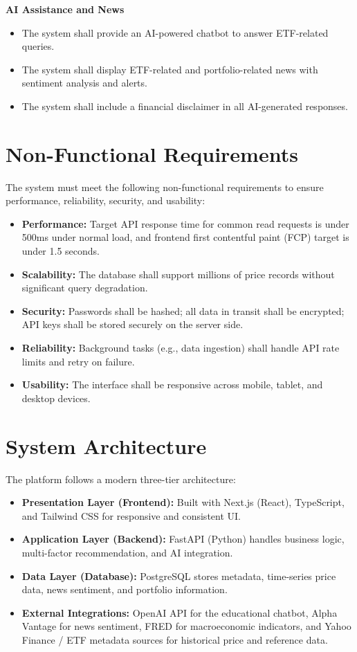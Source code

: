 \textbf{AI Assistance and News}
\begin{itemize}
    \item The system shall provide an AI-powered chatbot to answer ETF-related queries.
    \item The system shall display ETF-related and portfolio-related news with sentiment analysis and alerts.
    \item The system shall include a financial disclaimer in all AI-generated responses.
\end{itemize}




\section{Non-Functional Requirements}

The system must meet the following non-functional requirements to ensure performance, reliability, security, and usability:

\begin{itemize}
    \item \textbf{Performance:} Target API response time for common read requests is under 500ms under normal load, and frontend first contentful paint (FCP) target is under 1.5 seconds. 
    \item \textbf{Scalability:} The database shall support millions of price records without significant query degradation.
    \item \textbf{Security:} Passwords shall be hashed; all data in transit shall be encrypted; API keys shall be stored securely on the server side.
    \item \textbf{Reliability:} Background tasks (e.g., data ingestion) shall handle API rate limits and retry on failure.
    \item \textbf{Usability:} The interface shall be responsive across mobile, tablet, and desktop devices.
\end{itemize}

\section{System Architecture}

The platform follows a modern three-tier architecture:

\begin{itemize}
    \item \textbf{Presentation Layer (Frontend):} Built with Next.js (React), TypeScript, and Tailwind CSS for responsive and consistent UI.
    \item \textbf{Application Layer (Backend):} FastAPI (Python) handles business logic, multi-factor recommendation, and AI integration.
    \item \textbf{Data Layer (Database):} PostgreSQL stores metadata, time-series price data, news sentiment, and portfolio information.
    \item \textbf{External Integrations:} OpenAI API for the educational chatbot, Alpha Vantage for news sentiment, FRED for macroeconomic indicators, and Yahoo Finance / ETF metadata sources for historical price and reference data.
\end{itemize}

